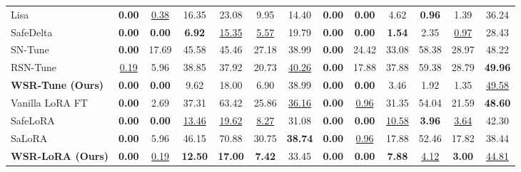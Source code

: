 \documentclass{article}
\begin{document}
\begin{table}[t]
{\begin{tabular}{lcccccc|cccccc}
Lisa
& \textbf{0.00} & \uline{0.38} & 16.35 & 23.08 & 9.95 & 14.40
& \textbf{0.00} & \textbf{0.00} & 4.62 & \textbf{0.96} & 1.39 & 36.24 \\

SafeDelta
& \textbf{0.00} & \textbf{0.00} & \textbf{6.92} & \uline{15.35} & \uline{5.57} & 19.79
& \textbf{0.00} & \textbf{0.00} & \textbf{1.54} & 2.35 & \uline{0.97} & 28.43 \\

SN-Tune
& \textbf{0.00} & 17.69 & 45.58 & 45.46 & 27.18 & 38.99
& \textbf{0.00} & 24.42 & 33.08 & 58.38 & 28.97 & 48.22 \\

RSN-Tune
& \uline{0.19} & 5.96 & 38.85 & 37.92 & 20.73 & \uline{40.26}
& \textbf{0.00} & 17.88 & 37.88 & 59.38 & 28.79 & \textbf{49.96} \\

\textbf{WSR-Tune (Ours)}
& \textbf{0.00} & \textbf{0.00} & 9.62 & 18.00 & 6.90 & 38.99
& \textbf{0.00} & \textbf{0.00} & 3.46 & 1.92 & 1.35 & \uline{49.58} \\

\midrule

Vanilla LoRA FT
& \textbf{0.00} & 2.69 & 37.31 & 63.42 & 25.86 & \uline{36.16}
& \textbf{0.00} & \uline{0.96} & 31.35 & 54.04 & 21.59 & \textbf{48.60} \\

SafeLoRA
& \textbf{0.00} & \textbf{0.00} & \uline{13.46} & \uline{19.62} & \uline{8.27} & 31.08
& \textbf{0.00} & \textbf{0.00} & \uline{10.58} & \textbf{3.96} & \uline{3.64} & 42.30 \\

SaLoRA
& \textbf{0.00} & 5.96 & 46.15 & 70.88 & 30.75 & \textbf{38.74}
& \textbf{0.00} & \uline{0.96} & 17.88 & 52.46 & 17.82 & 38.44 \\

\textbf{WSR-LoRA (Ours)}
& \textbf{0.00} & \uline{0.19} & \textbf{12.50} & \textbf{17.00} & \textbf{7.42} & 33.45
& \textbf{0.00} & \textbf{0.00} & \textbf{7.88} & \uline{4.12} & \textbf{3.00} & \uline{44.81} \\

\bottomrule
\end{tabular}
}

\vspace{1.0em}


\end{table}
\end{document}
